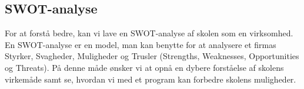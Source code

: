 \subsection{SWOT-analyse}
For at forstå \school bedre, kan vi lave en SWOT-analyse af skolen som en virksomhed. En SWOT-analyse er en model, man kan benytte for at analysere et firmas Styrker, Svagheder, Muligheder og Trusler (Strengths, Weaknesses, Opportunities og Threats). På denne måde ønsker vi at opnå en dybere forståelse af skolens virkemåde samt se, hvordan vi med et program kan forbedre skolens muligheder.
\begin{table}[!h]
	\centering
\end{table}
